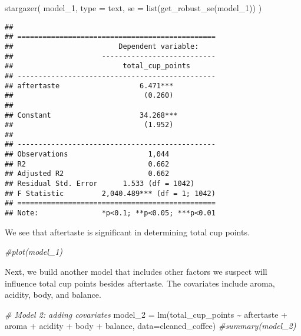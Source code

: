 \documentclass[
]{article}
\newenvironment{Shaded}{\begin{snugshade}}{\end{snugshade}}
\newcommand{\AttributeTok}[1]{\textcolor[rgb]{0.77,0.63,0.00}{#1}}
\newcommand{\CommentTok}[1]{\textcolor[rgb]{0.56,0.35,0.01}{\textit{#1}}}
\newcommand{\FunctionTok}[1]{\textcolor[rgb]{0.00,0.00,0.00}{#1}}
\newcommand{\NormalTok}[1]{#1}
\newcommand{\OtherTok}[1]{\textcolor[rgb]{0.56,0.35,0.01}{#1}}
\newcommand{\SpecialCharTok}[1]{\textcolor[rgb]{0.00,0.00,0.00}{#1}}
\newcommand{\StringTok}[1]{\textcolor[rgb]{0.31,0.60,0.02}{#1}}
\begin{document}
\begin{Shaded}
\begin{Highlighting}[]
 \FunctionTok{stargazer}\NormalTok{(}
\NormalTok{   model\_1, }
   \AttributeTok{type =} \StringTok{\textquotesingle{}text\textquotesingle{}}\NormalTok{, }
   \AttributeTok{se =} \FunctionTok{list}\NormalTok{(}\FunctionTok{get\_robust\_se}\NormalTok{(model\_1))}
\NormalTok{   )}
\end{Highlighting}
\end{Shaded}

\begin{verbatim}
## 
## ===============================================
##                         Dependent variable:    
##                     ---------------------------
##                          total_cup_points      
## -----------------------------------------------
## aftertaste                   6.471***          
##                               (0.260)          
##                                                
## Constant                     34.268***         
##                               (1.952)          
##                                                
## -----------------------------------------------
## Observations                   1,044           
## R2                             0.662           
## Adjusted R2                    0.662           
## Residual Std. Error      1.533 (df = 1042)     
## F Statistic         2,040.489*** (df = 1; 1042)
## ===============================================
## Note:               *p<0.1; **p<0.05; ***p<0.01
\end{verbatim}

We see that aftertaste is significant in determining total cup points.

\begin{Shaded}
\begin{Highlighting}[]
\CommentTok{\#plot(model\_1)}
\end{Highlighting}
\end{Shaded}

Next, we build another model that includes other factors we suspect will
influence total cup points besides aftertaste. The covariates include
aroma, acidity, body, and balance.

\begin{Shaded}
\begin{Highlighting}[]
\CommentTok{\# Model 2: adding covariates}
\NormalTok{model\_2 }\OtherTok{=} \FunctionTok{lm}\NormalTok{(total\_cup\_points }\SpecialCharTok{\textasciitilde{}}\NormalTok{ aftertaste }\SpecialCharTok{+}\NormalTok{ aroma }\SpecialCharTok{+}\NormalTok{ acidity }\SpecialCharTok{+}\NormalTok{ body }\SpecialCharTok{+}\NormalTok{ balance, }\AttributeTok{data=}\NormalTok{cleaned\_coffee)}
\CommentTok{\#summary(model\_2)}
\end{Highlighting}
\end{Shaded}
\end{document}
